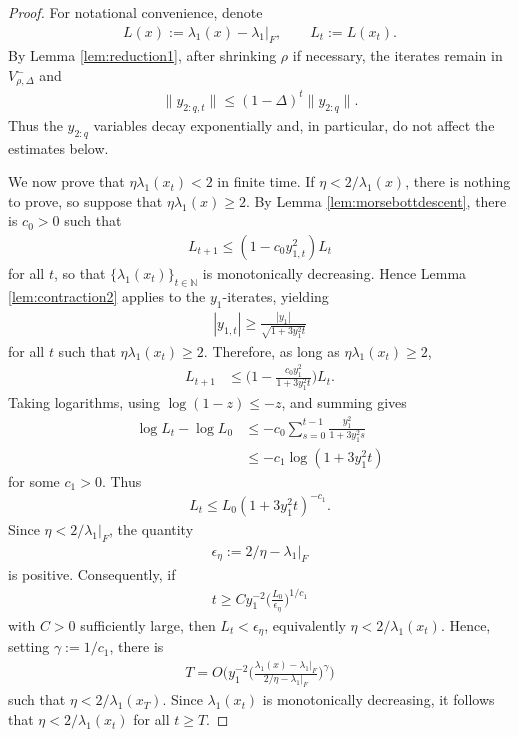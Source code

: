 \documentclass{article}
\newcommand{\NB}{\mathbb{N}}
\theoremstyle{plain}
\theoremstyle{definition}
\theoremstyle{remark}
\begin{document}
\begin{proof}
    For notational convenience, denote
    \begin{align}
        L(x):=\lambda_1(x)-\lambda_1|_F,\qquad L_t:=L(x_t).
    \end{align}
    By Lemma \ref{lem:reduction1}, after shrinking $\rho$ if necessary, the iterates remain in $V^-_{\rho,\Delta}$ and
    \begin{align}
        \|y_{2:q,t}\|\leq (1-\Delta)^t\|y_{2:q}\|.
    \end{align}
    Thus the $y_{2:q}$ variables decay exponentially and, in particular, do not affect the estimates below.

    We now prove that $\eta\lambda_1(x_t)<2$ in finite time. If $\eta<2/\lambda_1(x)$, there is nothing to prove, so suppose that $\eta\lambda_1(x)\geq 2$. By Lemma \ref{lem:morsebottdescent}, there is $c_0>0$ such that
    \begin{align}
        L_{t+1}\leq (1-c_0y_{1,t}^2)L_t
    \end{align}
    for all $t$, so that $\{\lambda_1(x_t)\}_{t\in\NB}$ is monotonically decreasing. Hence Lemma \ref{lem:contraction2} applies to the $y_1$-iterates, yielding
    \begin{align}
        |y_{1,t}|\geq \frac{|y_1|}{\sqrt{1+3y_1^2t}}
    \end{align}
    for all $t$ such that $\eta\lambda_1(x_t)\geq 2$. Therefore, as long as $\eta\lambda_1(x_t)\geq 2$,
    \begin{align}
        L_{t+1}
        &\leq \bigg(1-\frac{c_0y_1^2}{1+3y_1^2t}\bigg)L_t.
    \end{align}
    Taking logarithms, using $\log(1-z)\leq -z$, and summing gives
    \begin{align}
        \log L_t-\log L_0
        &\leq -c_0\sum_{s=0}^{t-1}\frac{y_1^2}{1+3y_1^2s}  \\
        &\leq -c_1\log(1+3y_1^2t)
    \end{align}
    for some $c_1>0$. Thus
    \begin{align}
        L_t\leq L_0(1+3y_1^2t)^{-c_1}.
    \end{align}
    Since $\eta<2/\lambda_1|_F$, the quantity
    \begin{align}
        \epsilon_{\eta}:=2/\eta-\lambda_1|_F
    \end{align}
    is positive. Consequently, if
    \begin{align}
        t\geq C y_1^{-2}\bigg(\frac{L_0}{\epsilon_{\eta}}\bigg)^{1/c_1}
    \end{align}
    with $C>0$ sufficiently large, then $L_t<\epsilon_{\eta}$, equivalently $\eta<2/\lambda_1(x_t)$. Hence, setting $\gamma:=1/c_1$, there is
    \begin{align}
        T=O\bigg(y_1^{-2}\bigg(\frac{\lambda_1(x)-\lambda_1|_F}{2/\eta-\lambda_1|_F}\bigg)^\gamma\bigg)
    \end{align}
    such that $\eta<2/\lambda_1(x_T)$. Since $\lambda_1(x_t)$ is monotonically decreasing, it follows that $\eta<2/\lambda_1(x_t)$ for all $t\geq T$.


\end{proof}
\end{document}
